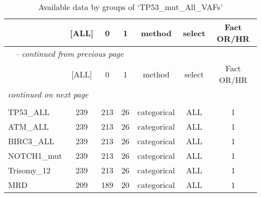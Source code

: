     
    \begin{longtable}{lcccccc}\caption{Available data by groups of `TP53\_mut\_All\_VAFs'}\\
    \hline  
     & [ALL] &  0  & 1  &   method    & select & Fact OR/HR \\ 
 
    \hline 
    \hline  
    \endfirsthead 
    \multicolumn{7}{l}{\tablename\ \thetable{} \textit{-- continued from previous page}}\\ 
    \hline
     & [ALL] &  0  & 1  &   method    & select & Fact OR/HR \\ 
 
    \hline
    \hline 
    \endhead   
    \hline
    \multicolumn{7}{l}{\textit{continued on next page}} \\ 
    \endfoot    
    \multicolumn{7}{l}{}  \\ 
    \endlastfoot 
    TP53\_ALL &  239  & 213 & 26 & categorical &  ALL   &     1     \\ 
ATM\_ALL &  239  & 213 & 26 & categorical &  ALL   &     1     \\ 
BIRC3\_ALL &  239  & 213 & 26 & categorical &  ALL   &     1     \\ 
NOTCH1\_mut &  239  & 213 & 26 & categorical &  ALL   &     1     \\ 
Trisomy\_12 &  239  & 213 & 26 & categorical &  ALL   &     1     \\ 
MRD &  209  & 189 & 20 & categorical &  ALL   &     1      \\ 

    \hline
    \end{longtable}
